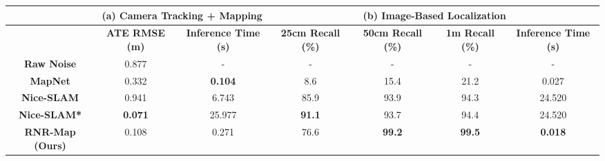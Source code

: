 \begin{tabular}{@{}ccc|cccc@{}}
\toprule
 & \multicolumn{2}{c|}{\textbf{(a) Camera Tracking + Mapping}} & \multicolumn{4}{c}{ \textbf{(b) Image-Based Localization}} \\ \midrule
 & \textbf{ATE RMSE (m)} & \textbf{Inference Time (s)} & \textbf{25cm Recall (\%)} & \textbf{50cm Recall (\%)} & \textbf{1m Recall (\%)} & \textbf{Inference Time (s)} \\ \midrule
\textbf{Raw Noise} & 0.877 & - & - & - & - & - \\
\textbf{MapNet \cite{MapNet}} & 0.332 & \textbf{0.104} & 8.6 & 15.4 & 21.2 & 0.027 \\
\textbf{Nice-SLAM \cite{nice-slam}} & 0.941 & 6.743 & 85.9 & 93.9 & 94.3 & 24.520 \\
\textbf{Nice-SLAM* \cite{nice-slam}} & \textbf{0.071} & 25.977 & \textbf{91.1} & 93.7 & 94.4 & 24.520 \\ \midrule
\textbf{RNR-Map (Ours)} & 0.108 & 0.271 & 76.6 & \textbf{99.2} & \textbf{99.5} & \textbf{0.018} \\ \bottomrule
\end{tabular}

